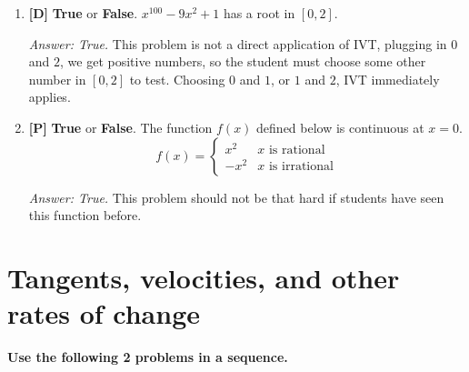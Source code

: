 \documentclass[12pt]{article}
\begin{document}
\begin{enumerate}
\bigskip

\item {\bf [D]} \textbf{True} or \textbf{False}. $x^{100}-9x^2+1$ has a root in $[0,2]$.

{\it Answer: True.} This problem is not a direct application of IVT, plugging in $0$ and $2$, we get positive numbers, so the student must choose some other number in $[0,2]$ to test. Choosing $0$ and $1$, or $1$ and $2$, IVT immediately applies.

\bigskip

\item {\bf [P]} \textbf{True} or \textbf{False}. The function $f(x)$
defined below is continuous at $x=0$.
\[f(x)=\left\{\begin{array}{ll}
             x^2 & \mbox{$x$ is rational} \\
             -x^2 & \mbox{$x$ is irrational}
		\end{array}\right.\]

{\it Answer: True.}  This problem should not be that hard if students
have seen this function before.

\end{enumerate}

\pagebreak
\section{Tangents, velocities, and other rates of change}

{\bf Use the following 2 problems in a sequence.} 
\end{document}
